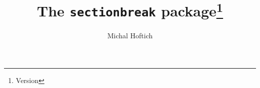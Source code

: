 \documentclass[a4page]{ltxdoc}
\begin{document}
\title{The \texttt{sectionbreak} package\footnote{Version \version}}
\author{Michal Hoftich}
\date{\gitdate}
\maketitle
{}





\end{document}
